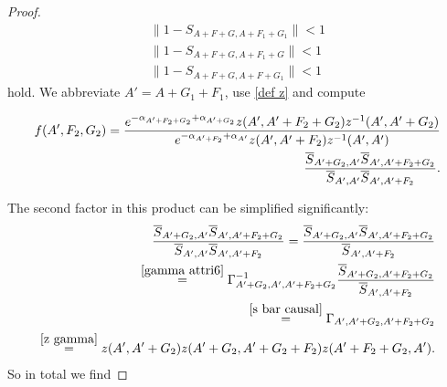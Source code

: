 \documentclass[b5paper,draft,openbib,12pt]{memoir}
\begin{document}
\begin{proof}
 \begin{align}
 \|1-S_{A+F+G,A+F_1+G_1}\|<1\\
 \|1-S_{A+F+G,A+F_1+G}\|<1\\
 \|1-S_{A+F+G,A+F+G_1}\|<1
 \end{align} 
 hold. We abbreviate \(A'=A+G_1+F_1\), use \eqref{def z} and compute
 
 \begin{align}\notag
 f(A',F_2,G_2)=\frac{e^{-\alpha_{A'+F_2+G_2}+\alpha_{A'+G_2}}z(A',A'+F_2+G_2)z^{-1}(A',A'+G_2)}{e^{-\alpha_{A'+F_2}+\alpha_{A'}}z(A',A'+F_2)z^{-1}(A',A')} \\
 \frac{\overline{S}_{A'+G_2,A'}\overline{S}_{A',A'+F_2+G_2}}{\overline{S}_{A',A'}\overline{S}_{A',A'+F_2}}.
 \end{align}

The second factor in this product can be simplified significantly:
\begin{align}
 \frac{\overline{S}_{A'+G_2,A'}\overline{S}_{A',A'+F_2+G_2}}{\overline{S}_{A',A'}\overline{S}_{A',A'+F_2}}
 = \frac{\overline{S}_{A'+G_2,A'}\overline{S}_{A',A'+F_2+G_2}}{\overline{S}_{A',A'+F_2}}\\
 \overset{\eqref{gamma attri6}}{=}\Gamma^{-1}_{A'+G_2,A',A'+F_2+G_2}\frac{\overline{S}_{A'+G_2,A'+F_2+G_2}}{\overline{S}_{A',A'+F_2}}\\
 \overset{\eqref{s bar causal}}{=}\Gamma_{A',A'+G_2,A'+F_2+G_2}\\
\overset{ \eqref{z gamma}}{=}z(A',A'+G_2)z(A'+G_2,A'+G_2+F_2)z(A'+F_2+G_2,A').
\end{align}
So in total we find


\end{proof}
\end{document}
